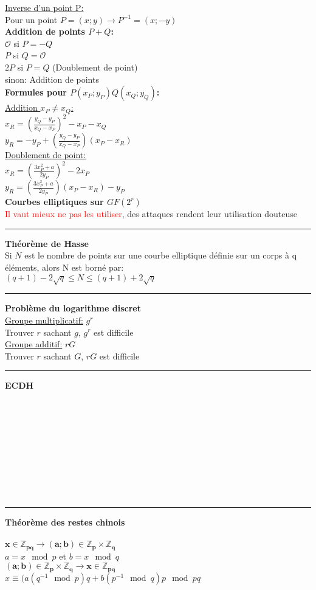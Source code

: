 \documentclass{article}
\begin{document}
\begin{multicols*}{2}
\uline{Inverse d'un point P:}\\
Pour un point $P = (x;y) \rightarrow P^{-1} = (x;-y)$\\
\textbf{Addition de points $P+Q$:}\\
$\mathcal{O}$ si $P = -Q$\\
$P$ si $Q =  \mathcal{O}$\\
$2P$ si $P = Q$ (Doublement de point)\\
sinon: Addition de points\\
\textbf{Formules pour $P(x_P; y_P) Q(x_Q; y_Q)$:}\\
\uline{Addition $x_P \not= x_Q$:}\\
	$x_R = (\frac{y_Q - y_P}{x_Q-x_P})^2 - x_P - x_Q$\\
	$y_R = -y_P + (\frac{y_Q - y_P}{x_Q-x_P})(x_P-x_R)$\\ 
\uline{Doublement de point:}\\
	$x_R = (\frac{3x_P^2 + a}{2y_P})^2 - 2x_P$\\
	$y_R = (\frac{3x_P^2 + a}{2y_P})(x_P-x_R) - y_P$\\
\textbf{Courbes elliptiques sur $GF(2^r)$}\\
\textcolor{red}{Il vaut mieux ne pas les utiliser}, des attaques rendent leur utilisation douteuse\\
\noindent\rule{7cm}{0.5pt}
\newpage

\textbf{Théorème de Hasse}\\
Si $N$ est le nombre de points sur une courbe elliptique définie sur un corps à q éléments, alors N est borné par:\\
$(q+1) -2\sqrt{q} \leqslant N \leqslant (q+1)+2\sqrt{q}$ \\
\noindent\rule{7cm}{0.5pt}
\textbf{Problème du logarithme discret}\\
\uline{Groupe multiplicatif:} $g^r$ \\
Trouver $r$ sachant $g$, $g^r$ est difficile\\
\uline{Groupe additif:} $rG$ \\
Trouver $r$ sachant $G$, $rG$ est difficile\\
\noindent\rule{7cm}{0.5pt}
\textbf{ECDH}\\
\\
\\
\\
\\
\\
\\
\\
\\
\\
\noindent\rule{7cm}{0.5pt}
\textbf{Théorème des restes chinois}\\
\\
$\bm{x \in \mathbb{Z}_{pq} \rightarrow (a;b) \in \mathbb{Z}_{p} \times \mathbb{Z}_{q}} $\\
$a = x \mod{p}$ et $b = x \mod{q} $\\

$\bm{(a;b) \in \mathbb{Z}_{p} \times \mathbb{Z}_{q} \rightarrow x \in \mathbb{Z}_{pq}} $\\
\small{$x \equiv (a(q^{-1} \mod{p})q + b(p^{-1} \mod{q})p \mod{pq} $}

\end{multicols*}
\end{document}
